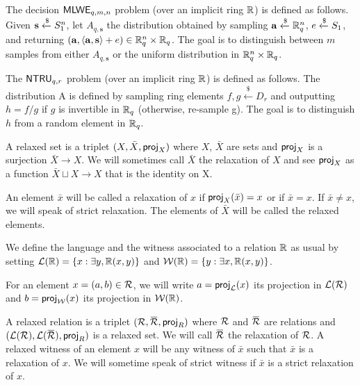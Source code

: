 \begin{definition}
	The decision $\mathsf{MLWE}_{q, m, n}$ problem (over an implicit ring $\mathbb{R}$) is defined as
	follows. Given $\mathbf{s}  \xleftarrow{\$} S_{1}^n$, let $A_{q,\mathbf{s}}$ the distribution
	obtained by sampling $\mathbf{a} \xleftarrow{\$} \mathbb{R}^n_q$, $e \xleftarrow{\$} S_{1}$,
	and returning $(\mathbf{a}, \left<\mathbf{a},\mathbf{s}\right> + e) \in \mathbb{R}^n_q \times
		\mathbb{R}_q$. The goal is to distinguish between $m$ samples from either $A_{q,
				\mathbf{s}}$ or the uniform distribution in $\mathbb{R}^n_q\times \mathbb{R}_q$.
\end{definition}

\begin{definition}
	The $\mathsf{NTRU}_{q,r}$ problem (over an implicit ring $\mathbb{R}$) is defined as
	follows.  The distribution A is defined by sampling ring elements $f, g \xleftarrow{\$} D_r$
	and outputting $h = f/g$ if $g$ is invertible in $\mathbb{R}_q$ (otherwise, re-sample g).
	The goal is to distinguish $h$ from a random element in $\mathbb{R}_q$.
\end{definition}


	A relaxed set is a triplet $(X,\bar{X}, \projX)$ where $X$, $\bar{X}$ are sets and $\projX$
	is a surjection $\bar{X} \rightarrow X$. We will sometimes call $\bar{X}$ the relaxation of
	$X$ and see $\projX$ as a function $\bar{X} \sqcup X \rightarrow X$ that is
	the identity on X.

	An element $\bar{x}$ will be called a relaxation of $x$ if 
$\projX(\bar{x}) = x$ or if
	$\bar{x} = x$. If $\bar{x} \neq x$, we will speak of 
strict relaxation.
	The elements of $\bar{X}$ will be called the relaxed elements.


	We define the language and the witness associated to a relation $\mathbb{R}$ as usual by setting
	$\mathcal{L}(\mathbb{R}) = \{ x : \exists y, \mathbb{R}(x, y)\}$ and $\mathcal{W}(\mathbb{R}) = \{ y : \exists x, \mathbb{R}(x, y)\}$.

	For an element $x = (a,b) \in \mathcal{R}$, we will write $a=\projL(x)$ its projection in
	$\mathcal{L}(\mathcal{R})$ and $b=\projW(x)$ its projection in $\mathcal{W}(\mathbb{R})$.

	A relaxed relation is a triplet $(\relation,\barrelation, \proj_R)$ where 
	$\mathcal{R}$ and $\barrelation$ are relations and
	$(\Language{\relation},\Language{\barrelation}, \proj_R)$ is a relaxed set.
	We will call $\barrelation$ the relaxation of $\mathcal{R}$.
	A relaxed witness of an element $x$ will be any witness of $\bar{x}$ such that
	$\bar{x}$ is a relaxation of $x$. We will sometime speak of strict witness if $\bar{x}$
	is a strict relaxation of $x$.


